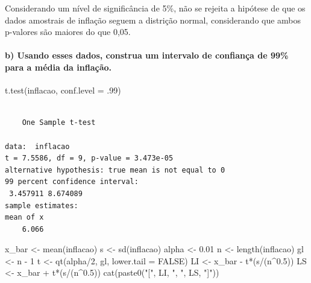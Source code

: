 \documentclass[
  letterpaper,
  DIV=11,
  numbers=noendperiod]{scrartcl}
\let\oldparagraph\paragraph
\renewcommand{\paragraph}[1]{\oldparagraph{#1}\mbox{}}
\newenvironment{Shaded}{\begin{snugshade}}{\end{snugshade}}
\newcommand{\AttributeTok}[1]{\textcolor[rgb]{0.40,0.45,0.13}{#1}}
\newcommand{\ConstantTok}[1]{\textcolor[rgb]{0.56,0.35,0.01}{#1}}
\newcommand{\DecValTok}[1]{\textcolor[rgb]{0.68,0.00,0.00}{#1}}
\newcommand{\FloatTok}[1]{\textcolor[rgb]{0.68,0.00,0.00}{#1}}
\newcommand{\FunctionTok}[1]{\textcolor[rgb]{0.28,0.35,0.67}{#1}}
\newcommand{\NormalTok}[1]{\textcolor[rgb]{0.00,0.23,0.31}{#1}}
\newcommand{\OtherTok}[1]{\textcolor[rgb]{0.00,0.23,0.31}{#1}}
\newcommand{\SpecialCharTok}[1]{\textcolor[rgb]{0.37,0.37,0.37}{#1}}
\newcommand{\StringTok}[1]{\textcolor[rgb]{0.13,0.47,0.30}{#1}}
\begin{document}
Considerando um nível de significância de 5\%, não se rejeita a hipótese
de que os dados amostrais de inflação seguem a distrição normal,
considerando que ambos p-valores são maiores do que 0,05.

\hypertarget{b-usando-esses-dados-construa-um-intervalo-de-confianuxe7a-de-99-para-a-muxe9dia-da-inflauxe7uxe3o.}{%
\paragraph{b) Usando esses dados, construa um intervalo de confiança de
99\% para a média da
inflação.}\label{b-usando-esses-dados-construa-um-intervalo-de-confianuxe7a-de-99-para-a-muxe9dia-da-inflauxe7uxe3o.}}

\begin{Shaded}
\begin{Highlighting}[]
\FunctionTok{t.test}\NormalTok{(inflacao, }\AttributeTok{conf.level =}\NormalTok{ .}\DecValTok{99}\NormalTok{)}
\end{Highlighting}
\end{Shaded}

\begin{verbatim}

    One Sample t-test

data:  inflacao
t = 7.5586, df = 9, p-value = 3.473e-05
alternative hypothesis: true mean is not equal to 0
99 percent confidence interval:
 3.457911 8.674089
sample estimates:
mean of x 
    6.066 
\end{verbatim}

\begin{Shaded}
\begin{Highlighting}[]
\NormalTok{x\_bar }\OtherTok{\textless{}{-}} \FunctionTok{mean}\NormalTok{(inflacao)}
\NormalTok{s }\OtherTok{\textless{}{-}} \FunctionTok{sd}\NormalTok{(inflacao)}
\NormalTok{alpha }\OtherTok{\textless{}{-}}  \FloatTok{0.01}
\NormalTok{n }\OtherTok{\textless{}{-}} \FunctionTok{length}\NormalTok{(inflacao)}
\NormalTok{gl }\OtherTok{\textless{}{-}}\NormalTok{ n }\SpecialCharTok{{-}} \DecValTok{1}
\NormalTok{t }\OtherTok{\textless{}{-}} \FunctionTok{qt}\NormalTok{(alpha}\SpecialCharTok{/}\DecValTok{2}\NormalTok{, gl, }\AttributeTok{lower.tail =} \ConstantTok{FALSE}\NormalTok{)}
\NormalTok{LI }\OtherTok{\textless{}{-}}\NormalTok{ x\_bar }\SpecialCharTok{{-}}\NormalTok{ t}\SpecialCharTok{*}\NormalTok{(s}\SpecialCharTok{/}\NormalTok{(n}\SpecialCharTok{\^{}}\FloatTok{0.5}\NormalTok{))}
\NormalTok{LS }\OtherTok{\textless{}{-}}\NormalTok{ x\_bar }\SpecialCharTok{+}\NormalTok{ t}\SpecialCharTok{*}\NormalTok{(s}\SpecialCharTok{/}\NormalTok{(n}\SpecialCharTok{\^{}}\FloatTok{0.5}\NormalTok{))}
\FunctionTok{cat}\NormalTok{(}\FunctionTok{paste0}\NormalTok{(}\StringTok{"["}\NormalTok{, LI, }\StringTok{", "}\NormalTok{, LS, }\StringTok{"]"}\NormalTok{))}
\end{Highlighting}
\end{Shaded}
\end{document}
